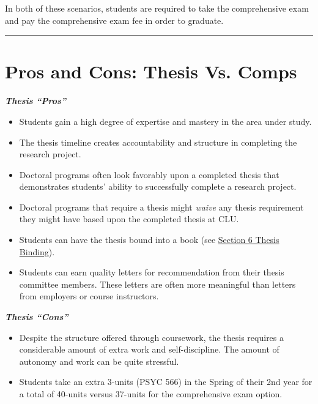 \documentclass[openany]{book}
\providecommand{\tightlist}{%
  \setlength{\itemsep}{0pt}\setlength{\parskip}{0pt}}
\begin{document}
In both of these scenarios, students are required to take the comprehensive exam and pay the comprehensive exam fee in order to graduate.

\begin{center}\rule{0.5\linewidth}{0.5pt}\end{center}

\hypertarget{pros-and-cons-thesis-vs.-comps}{%
\section{Pros and Cons: Thesis Vs. Comps}\label{pros-and-cons-thesis-vs.-comps}}

\textbf{\emph{Thesis ``Pros''}}

\begin{itemize}
\tightlist
\item
  Students gain a high degree of expertise and mastery in the area under study.
\item
  The thesis timeline creates accountability and structure in completing the research project.
\item
  Doctoral programs often look favorably upon a completed thesis that demonstrates students' ability to successfully complete a research project.
\item
  Doctoral programs that require a thesis might \emph{waive} any thesis requirement they might have based upon the completed thesis at CLU.
\item
  Students can have the thesis bound into a book (see \protect\hyperlink{binding}{Section 6 Thesis Binding}).
\item
  Students can earn quality letters for recommendation from their thesis committee members. These letters are often more meaningful than letters from employers or course instructors.
\end{itemize}

\textbf{\emph{Thesis ``Cons''}}

\begin{itemize}
\tightlist
\item
  Despite the structure offered through coursework, the thesis requires a considerable amount of extra work and self-discipline. The amount of autonomy and work can be quite stressful.
\item
  Students take an extra 3-units (PSYC 566) in the Spring of their 2nd year for a total of 40-units versus 37-units for the comprehensive exam option.
\end{itemize}
\end{document}
